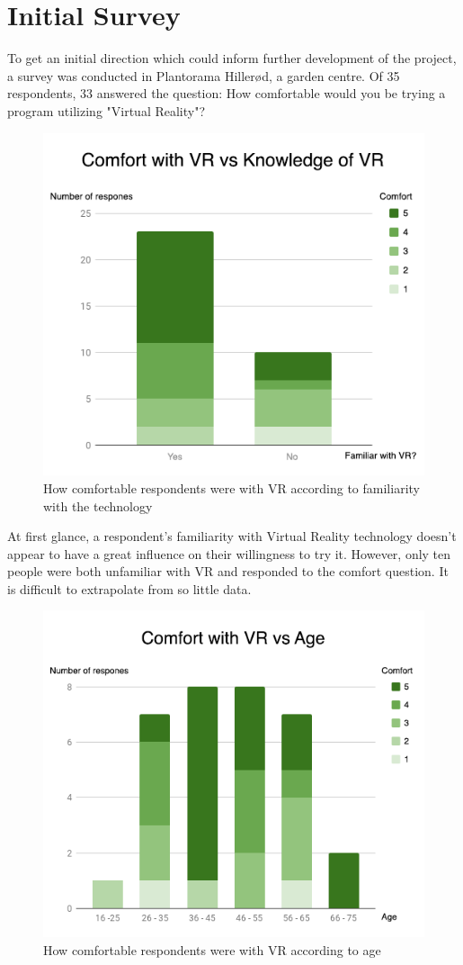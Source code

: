 				\section{Initial Survey}
			
			To get an initial direction which could inform further development of the project, a survey was conducted in Plantorama Hillerød, a garden centre. Of 35 respondents, 33 answered the question: How comfortable would you be trying a program utilizing "Virtual Reality"?
			
			\begin{figure}[H]
				\centering
				\includegraphics[width=0.6\linewidth]{figure/Analysis/comfort.png}
				\caption{How comfortable respondents were with VR according to familiarity with the technology}
				\label{fig:comfort}
			\end{figure}
			
			At first glance, a respondent's familiarity with Virtual Reality technology doesn't appear to have a great influence on their willingness to try it. However, only ten people were both unfamiliar with VR and responded to the comfort question. It is difficult to extrapolate from so little data.
			
			\begin{figure}[H]
				\centering
				\includegraphics[width=0.6\linewidth]{figure/Analysis/vrcomfort.png}
				\caption{How comfortable respondents were with VR according to age}
				\label{fig:vrcomfort}
			\end{figure}
			
